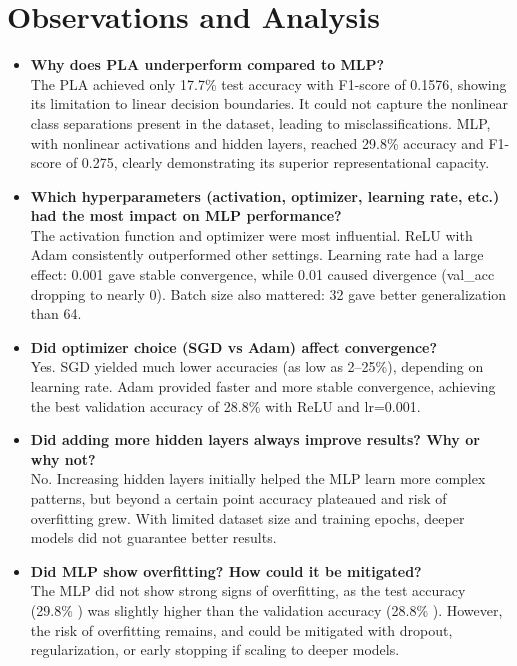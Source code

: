 \documentclass[11pt]{article}
\begin{document}
\section{Observations and Analysis} 
\begin{itemize} 
    \item \textbf{Why does PLA underperform compared to MLP?} \\
    The PLA achieved only 17.7\% test accuracy with F1-score of 0.1576, showing its limitation to linear decision boundaries. It could not capture the nonlinear class separations present in the dataset, leading to misclassifications. MLP, with nonlinear activations and hidden layers, reached 29.8\% accuracy and F1-score of 0.275, clearly demonstrating its superior representational capacity.

    \item \textbf{Which hyperparameters (activation, optimizer, learning rate, etc.) had the most impact on MLP performance?} \\
    The activation function and optimizer were most influential. ReLU with Adam consistently outperformed other settings. Learning rate had a large effect: 0.001 gave stable convergence, while 0.01 caused divergence (val\_acc dropping to nearly 0). Batch size also mattered: 32 gave better generalization than 64.

    \item \textbf{Did optimizer choice (SGD vs Adam) affect convergence?} \\
    Yes. SGD yielded much lower accuracies (as low as 2–25\%), depending on learning rate. Adam provided faster and more stable convergence, achieving the best validation accuracy of 28.8\% with ReLU and lr=0.001.

    \item \textbf{Did adding more hidden layers always improve results? Why or why not?} \\
    No. Increasing hidden layers initially helped the MLP learn more complex patterns, but beyond a certain point accuracy plateaued and risk of overfitting grew. With limited dataset size and training epochs, deeper models did not guarantee better results.

    \item \textbf{Did MLP show overfitting? How could it be mitigated?} \\
    The MLP did not show strong signs of overfitting, as the test accuracy (29.8\% ) was slightly higher than the validation accuracy (28.8\% ). However, the risk of overfitting remains, and could be mitigated with dropout, regularization, or early stopping if scaling to deeper models.
\end{itemize}
\end{document}

